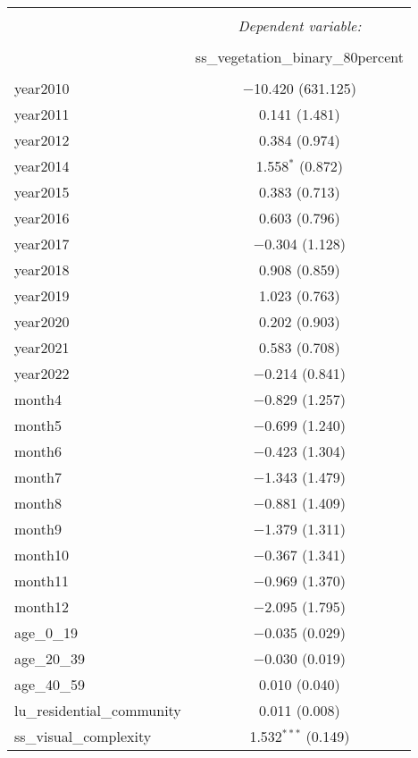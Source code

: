 \begin{table}[!htbp] \centering 
  \caption{} 
  \label{} 
\small 
\begin{tabular}{@{\extracolsep{1pt}}lc} 
\\[-1.8ex]\hline 
\hline \\[-1.8ex] 
 & \multicolumn{1}{c}{\textit{Dependent variable:}} \\ 
\cline{2-2} 
\\[-1.8ex] & ss\_vegetation\_binary\_80percent \\ 
\hline \\[-1.8ex] 
 year2010 & $-$10.420 (631.125) \\ 
  year2011 & 0.141 (1.481) \\ 
  year2012 & 0.384 (0.974) \\ 
  year2014 & 1.558$^{*}$ (0.872) \\ 
  year2015 & 0.383 (0.713) \\ 
  year2016 & 0.603 (0.796) \\ 
  year2017 & $-$0.304 (1.128) \\ 
  year2018 & 0.908 (0.859) \\ 
  year2019 & 1.023 (0.763) \\ 
  year2020 & 0.202 (0.903) \\ 
  year2021 & 0.583 (0.708) \\ 
  year2022 & $-$0.214 (0.841) \\ 
  month4 & $-$0.829 (1.257) \\ 
  month5 & $-$0.699 (1.240) \\ 
  month6 & $-$0.423 (1.304) \\ 
  month7 & $-$1.343 (1.479) \\ 
  month8 & $-$0.881 (1.409) \\ 
  month9 & $-$1.379 (1.311) \\ 
  month10 & $-$0.367 (1.341) \\ 
  month11 & $-$0.969 (1.370) \\ 
  month12 & $-$2.095 (1.795) \\ 
  age\_0\_19 & $-$0.035 (0.029) \\ 
  age\_20\_39 & $-$0.030 (0.019) \\ 
  age\_40\_59 & 0.010 (0.040) \\ 
  lu\_residential\_community & 0.011 (0.008) \\ 
  ss\_visual\_complexity & 1.532$^{***}$ (0.149) \\ 

\end{tabular}
\end{table}
